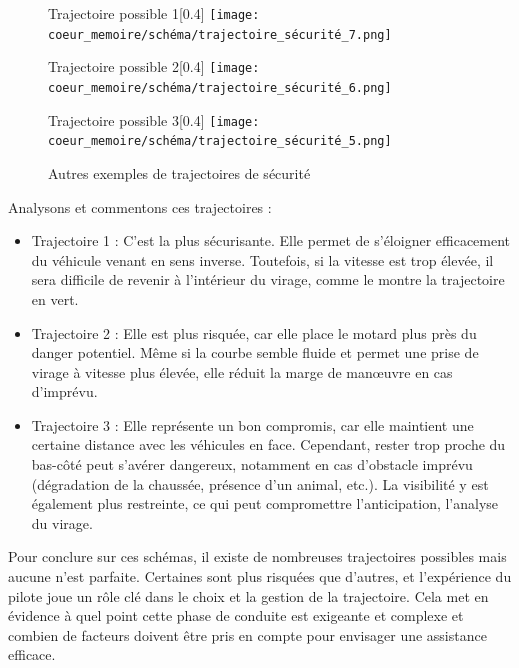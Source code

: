 \begin{figure}[H]
  \centering
  \begin{subcaptionbox}{Trajectoire possible 1}[0.4\linewidth]
    {\texttt{[image: coeur\_memoire/schéma/trajectoire\_sécurité\_7.png]}}
  \end{subcaptionbox}
  \hfill
  \begin{subcaptionbox}{Trajectoire possible 2}[0.4\linewidth]
    {\texttt{[image: coeur\_memoire/schéma/trajectoire\_sécurité\_6.png]}}
  \end{subcaptionbox}
  
  \vspace{0.5cm}
  
  \begin{subcaptionbox}{Trajectoire possible 3}[0.4\linewidth]
    {\texttt{[image: coeur\_memoire/schéma/trajectoire\_sécurité\_5.png]}}

  \end{subcaptionbox}

  \caption{Autres exemples de trajectoires de sécurité}
\end{figure}

Analysons et commentons ces trajectoires :
\begin{itemize}
    \item Trajectoire 1 : C’est la plus sécurisante. Elle permet de s’éloigner efficacement du véhicule venant en sens inverse. Toutefois, si la vitesse est trop élevée, il sera difficile de revenir à l’intérieur du virage, comme le montre la trajectoire en vert.
    \item Trajectoire 2 : Elle est plus risquée, car elle place le motard plus près du danger potentiel. Même si la courbe semble fluide et permet une prise de virage à vitesse plus élevée, elle réduit la marge de manœuvre en cas d’imprévu.
    \item Trajectoire 3 : Elle représente un bon compromis, car elle maintient une certaine distance avec les véhicules en face. Cependant, rester trop proche du bas-côté peut s’avérer dangereux, notamment en cas d’obstacle imprévu (dégradation de la chaussée, présence d’un animal, etc.). La visibilité y est également plus restreinte, ce qui peut compromettre l’anticipation, l'analyse du virage.
\end{itemize}
Pour conclure sur ces schémas, il existe de nombreuses trajectoires possibles mais aucune n’est parfaite. Certaines sont plus risquées que d’autres, et l’expérience du pilote joue un rôle clé dans le choix et la gestion de la trajectoire. Cela met en évidence à quel point cette phase de conduite est exigeante et complexe et combien de facteurs doivent être pris en compte pour envisager une assistance efficace.


